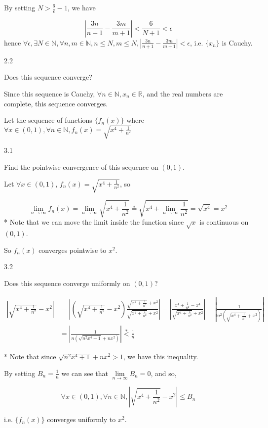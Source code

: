 \documentclass[12pt,a4paper]{article}
\begin{document}
By setting $N > \frac{6}{\epsilon} - 1$, we have

\[
\left| \frac{3n}{n+1} - \frac{3m}{m+1} \right| < \frac{6}{N+1} < \epsilon
\]
hence $\forall \epsilon, \exists N \in \mathbb{N}, \forall n,m \in \mathbb{N}, n \leq N, m \leq N, \left| \frac{3n}{n+1} - \frac{3m}{m+1} \right| < \epsilon$, i.e. $\{x_n\}$ is Cauchy.

2.2
\begin{ques}
	Does this sequence converge?
\end{ques}

Since this sequence is Cauchy, $\forall n \in \mathbb{N}, x_n \in \mathbb{R}$, and the real numbers are complete, this sequence converges.

\begin{ques}
	Let the sequence of functions $\{f_n(x)\}$ where $\forall x \in (0,1), \forall n \in \mathbb{N}, f_n(x) = \sqrt{x^4 + \frac{1}{n^2}}$
\end{ques}
3.1
\begin{ques}
	Find the pointwise convergence of this sequence on $(0,1)$.
\end{ques}

Let $\forall x \in (0,1)$, $f_n(x) = \sqrt{x^4 + \frac{1}{n^2}}$, so

\[
\lim\limits_{n \rightarrow \infty} f_n(x) = \lim\limits_{n \rightarrow \infty}\sqrt{x^4 + \frac{1}{n^2}} \overset{*}{=} \sqrt{x^4 + \lim\limits_{n \rightarrow \infty} \frac{1}{n^2}} = \sqrt{x^4} = x^2
\]
* Note that we can move the limit inside the function since $\sqrt{x}$ is continuous on $(0,1)$.

So $f_n(x)$ converges pointwise to $x^2$.

3.2
\begin{ques}
	Does this sequence converge uniformly on $(0,1)$?
\end{ques}

\begin{align*}
\left| \sqrt{x^4 + \frac{1}{n^2}} - x^2 \right| & = \left| \left(\sqrt{x^4 + \frac{1}{n^2}} - x^2\right) \frac{\sqrt{x^4 + \frac{1}{n^2}} + x^2}{\sqrt{x^4 + \frac{1}{n^2}} + x^2} \right| = \left| \frac{x^4 + \frac{1}{n^2}-x^4}{\sqrt{x^4 + \frac{1}{n^2}} + x^2} \right| = \left| \frac{1}{n^2(\sqrt{x^4 + \frac{1}{n^2}} + x^2)}\right|\\
& = \left| \frac{1}{n(\sqrt{n^2x^4 + 1} + nx^2)}\right| \overset{*}{<} \frac{1}{n}
\end{align*}

* Note that since $\sqrt{n^2x^4 + 1} + nx^2 > 1$, we have this inequality.

By setting $B_n = \frac{1}{n}$ we can see that $\lim\limits_{n \rightarrow \infty} B_n = 0$, and so,

\[\forall x \in (0,1), \forall n \in \mathbb{N}, \left| \sqrt{x^4 + \frac{1}{n^2}} - x^2 \right| \leq B_n
\]

i.e. $\{f_n(x)\}$ converges uniformly to $x^2$.
\end{document}
